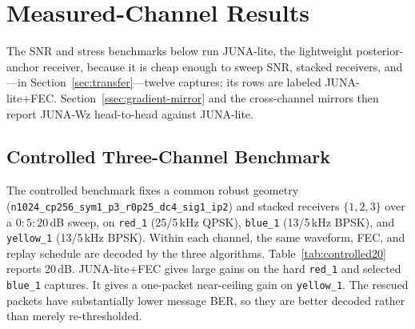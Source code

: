 \documentclass[journal]{IEEEtran}
\newcommand{\cfg}[1]{\texttt{#1}}
\newcommand{\junalite}{JUNA-lite}
\newcommand{\junawz}{JUNA-Wz}
\begin{document}
\section{Measured-Channel Results}\label{sec:results}
The SNR and stress benchmarks below run \junalite{}, the lightweight
posterior-anchor receiver, because it is cheap enough to sweep SNR, stacked
receivers, and---in Section~\ref{sec:transfer}---twelve captures; its rows are
labeled \junalite{}+FEC. Section~\ref{ssec:gradient-mirror} and the cross-channel
mirrors then report \junawz{} head-to-head against \junalite{}.

\subsection{Controlled Three-Channel Benchmark}
The controlled benchmark fixes a common robust geometry
(\cfg{n1024\_cp256\_sym1\_p3\_r0p25\_dc4\_sig1\_ip2}) and stacked receivers
$\{1,2,3\}$ over a $0{:}5{:}20$\,dB sweep, on \texttt{red\_1} (25/5\,kHz QPSK),
\texttt{blue\_1} (13/5\,kHz BPSK), and \texttt{yellow\_1} (13/5\,kHz BPSK).
Within each channel, the same waveform, FEC, and replay schedule are decoded by
the three algorithms. Table~\ref{tab:controlled20} reports
20\,dB. \junalite{}+FEC gives large gains on the hard \texttt{red\_1} and
selected \texttt{blue\_1} captures. It gives a one-packet near-ceiling gain on
\texttt{yellow\_1}. The rescued packets have substantially lower message BER,
so they are better decoded rather than merely re-thresholded.
\end{document}
